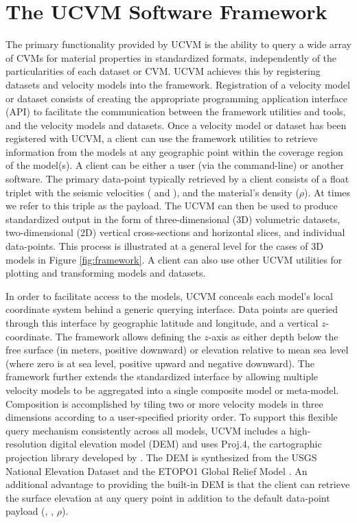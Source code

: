






\section{The UCVM Software Framework}\label{sec:ucvm}

The primary functionality provided by UCVM is the ability to query a wide array of CVMs for material properties in standardized formats, independently of the particularities of each dataset or CVM. UCVM achieves this by registering datasets and velocity models into the framework. Registration of a velocity model or dataset consists of creating the appropriate programming application interface (API) to facilitate the communication between the framework utilities and tools, and the velocity models and datasets. Once a velocity model or dataset has been registered with UCVM, a client can use the framework utilities to retrieve information from the models at any geographic point within the coverage region of the model(s). A client can be either a user (via the command-line) or another software. The primary data-point typically retrieved by a client consists of a float triplet with the seismic velocities (\vp{} and \vs{}), and the material's density ($\rho$). At times we refer to this triple as the payload. The UCVM can then be used to produce standardized output in the form of three-dimensional (3D) volumetric datasets, two-dimensional (2D) vertical cross-sections and horizontal slices, and individual data-points. This process is illustrated at a general level for the cases of 3D models in Figure \ref{fig:framework}. A client can also use other UCVM utilities for plotting and transforming models and datasets.

In order to facilitate access to the models, UCVM conceals each model's local coordinate system behind a generic querying interface. Data points are queried through this interface by geographic latitude and longitude, and a vertical $z$-coordinate. The framework allows defining the $z$-axis as either depth below the free surface (in meters, positive downward) or elevation relative to mean sea level (where zero is at sea level, positive upward and negative downward). The framework further extends the standardized interface by allowing multiple velocity models to be aggregated into a single composite model or meta-model. Composition is accomplished by tiling two or more velocity models in three dimensions according to a user-specified priority order. To support this flexible query mechanism consistently across all models, UCVM includes a high-resolution digital elevation model (DEM) and uses Proj.4, the cartographic projection library developed by \citet{Evenden_2003_Manual}. The DEM is synthesized from the USGS National Elevation Dataset \citep{Gesch_2002_PERS, Gesch_2007_Chap} and the ETOPO1 Global Relief Model \citep{Amante_2009_Manual}. An additional advantage to providing the built-in DEM is that the client can retrieve the surface elevation at any query point in addition to the default data-point payload (\vp{}, \vs{}, $\rho$).

